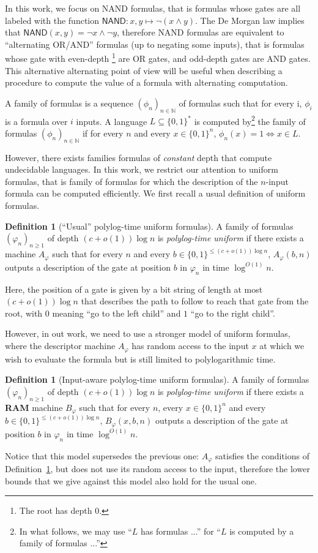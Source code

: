 \documentclass[a4paper, 11pt]{article}
\theoremstyle{plain}
\theoremstyle{definition}
\newtheorem{definition}[theorem]{Definition}
\theoremstyle{remark}
\newcommand{\NN}{\mathbb{N}}%
\newcommand{\bit}{\{0,1\}}%
\newcommand{\NAND}{\textsf{NAND}}%
\begin{document}
In this work, we focus on \NAND{} formulas, that is formulas whose gates are all labeled 
with the function $\NAND: x,y \mapsto \neg(x\wedge y)$.
The De Morgan law implies that $\NAND(x, y) = \neg x \wedge \neg y$, 
therefore \NAND{} formulas are equivalent to ``alternating OR/AND'' formulas (up to negating some inputs), 
that is formulas whose gate with even-depth \footnote{The root has depth 0.} 
are OR gates, and odd-depth gates are AND gates.
This alternative alternating point of view will be useful 
when describing a procedure to compute the value of a formula with alternating computation.

A family of formulas is a sequence $(\phi_n)_{n\in\NN}$ of formulas such that
for every i, $\phi_i$ is a formula over $i$ inputs.
A language $L\subseteq \bit^*$
is computed by\footnote{In what follows, we may use ``$L$ has formulas ...'' for ``$L$ is computed by a family of formulas ...''} 
the family of formulas $(\phi_n)_{n\in\NN}$
if for every $n$ and every $x\in\bit^n$, $\phi_n(x) = 1 \Leftrightarrow x\in L$.

However, there exists families formulas of \textit{constant} depth that compute undecidable languages.
In this work, we restrict our attention to uniform formulas, 
that is family of formulas for which the description of the
$n$-input formula can be computed efficiently.
We first recall a usual definition of uniform formulas.
\begin{definition}[``Usual'' polylog-time uniform formulas]
	A family of formulas $(\varphi_n)_{n \ge 1}$ of depth $(c + o(1))\log n$ 
	is \textit{polylog-time uniform} if there exists a machine $A_\varphi$
	such that for every $n$ and every $b\in\bit^{\leq (c + o(1))\log n}$,
	$A_\varphi(b, n)$ outputs a description of the gate at position $b$ in $\varphi_n$ in time $\log^{O(1)} n$.
\end{definition}

Here, the position of a gate is given by a bit string of length at most $(c + o(1))\log n$ 
that describes the path to follow to reach that gate from the root, 
with $0$ meaning ``go to the left child'' and $1$ ``go to the right child''.

However, in out work, we need to use a stronger model of uniform formulas, 
where the descriptor machine $A_\varphi$ has random access to the input $x$ 
at which we wish to evaluate the formula but is still limited to polylogarithmic time.
\begin{definition}[Input-aware polylog-time uniform formulas]\label{def:unif}
	A family of formulas $(\varphi_n)_{n \ge 1}$ of depth $(c + o(1))\log n$ is \textit{polylog-time uniform}
	if there exists a \textbf{RAM} machine $B_\varphi$
	such that for every $n$, every $x\in\bit^n$ and every 
	$b\in\bit^{\leq (c + o(1))\log n}$,
	$B_\varphi(x, b, n)$ outputs a description of the gate at position $b$ in $\varphi_n$ in time $\log^{O(1)} n$.
\end{definition}
Notice that this model supersedes the previous one: 
$A_\varphi$ satisfies the conditions of Definition~\ref{def:unif}, 
but does not use its random access to the input, 
therefore the lower bounds that we give against this model also hold for the usual one.
\end{document}
